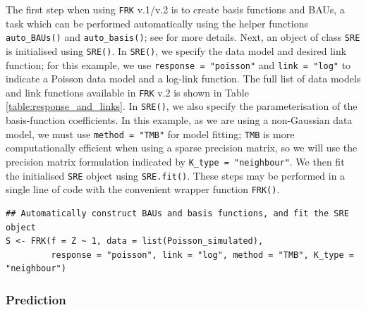 \documentclass[12pt,a4paper]{article}
\begin{document}
The first step when using \texttt{FRK} v.1/v.2 is to create basis functions and BAUs, a task which can be performed automatically using the helper functions \texttt{auto\_BAUs()} and \texttt{auto\_basis()}; see \cite{FRK_paper} for more details. 
Next, an object of class \texttt{SRE} is initialised using \texttt{SRE()}. 
In \texttt{SRE()}, we specify the data model and desired link function; for this example, we use \texttt{response = "poisson"} and \texttt{link = "log"} to indicate a Poisson data model and a log-link function. 
The full list of data models and link functions available in \texttt{FRK} v.2 is shown in Table \ref{table:response_and_links}. 
In \texttt{SRE()}, we also specify the parameterisation of the basis-function coefficients. 
In this example, as we are using a non-Gaussian data model, we must use \texttt{method = "TMB"} for model fitting; \texttt{TMB} is more computationally efficient when using a sparse precision matrix, so we will use the precision matrix formulation indicated by \texttt{K\_type = "neighbour"}.
 We then fit the initialised \texttt{SRE} object using \texttt{SRE.fit()}.
 These steps may be performed in a single line of code with the convenient wrapper function \texttt{FRK()}. 


\begin{minipage}{\linewidth}
\begin{lstlisting}[style=R]
## Automatically construct BAUs and basis functions, and fit the SRE object
S <- FRK(f = Z ~ 1, data = list(Poisson_simulated),
         response = "poisson", link = "log", method = "TMB", K_type = "neighbour")
\end{lstlisting}
\end{minipage}


\subsubsection{Prediction}


\end{document}
